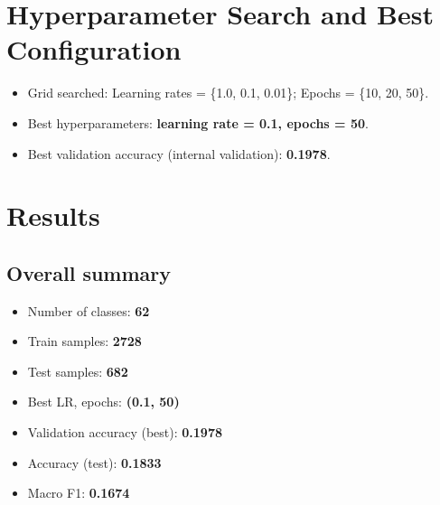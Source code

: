 \documentclass[11pt,a4paper]{article}
\begin{document}
\section{Hyperparameter Search and Best Configuration}
\begin{itemize}
  \item Grid searched: Learning rates = \{1.0, 0.1, 0.01\}; Epochs = \{10, 20, 50\}.
  \item Best hyperparameters: \textbf{learning rate = 0.1, epochs = 50}.
  \item Best validation accuracy (internal validation): \textbf{0.1978}.
\end{itemize}

\section{Results}
\subsection{Overall summary}
\begin{itemize}
  \item Number of classes: \textbf{62}
  \item Train samples: \textbf{2728}
  \item Test samples: \textbf{682}
  \item Best LR, epochs: \textbf{(0.1, 50)}
  \item Validation accuracy (best): \textbf{0.1978}
  \item Accuracy (test): \textbf{0.1833}
  \item Macro F1: \textbf{0.1674}
\end{itemize}
\end{document}
